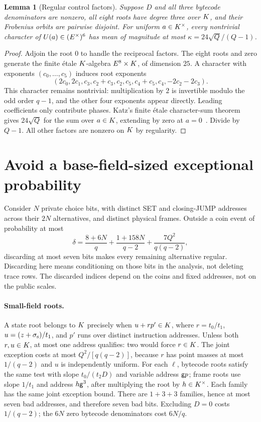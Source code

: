 \documentclass[11pt]{article}
\newtheorem{lemma}{Lemma}
\begin{document}
\begin{lemma}[Regular control factors]
Suppose $D$ and all three bytecode denominators are nonzero, all eight roots have degree three over $K$, and their Frobenius orbits are pairwise disjoint. For uniform $a\in K^\times$, every nontrivial character of $U(a)\in(E^\times)^6$ has mean of magnitude at most $\kappa=24\sqrt Q/(Q-1)$.
\end{lemma}
\begin{proof}
Adjoin the root $0$ to handle the reciprocal factors. The eight roots and zero generate the finite \'etale $K$-algebra $E^8\times K$, of dimension $25$. A character with exponents $(c_0,\ldots,c_5)$ induces root exponents
\[
 (2c_0,2c_1,c_3,c_2+c_3,c_2,c_5,c_4+c_5,c_4,-2c_2-2c_3).
\]
This character remains nontrivial: multiplication by $2$ is invertible modulo the odd order $q-1$, and the other four exponents appear directly. Leading coefficients only contribute phases. Katz's finite \'etale character-sum theorem gives $24\sqrt Q$ for the sum over $a\in K$, extending by zero at $a=0$~\cite{katz}. Divide by $Q-1$. All other factors are nonzero on $K$ by regularity.
\end{proof}

\section{Avoid a base-field-sized exceptional probability}

Consider $N$ private choice bits, with distinct SET and closing-JUMP addresses across their $2N$ alternatives, and distinct physical frames. Outside a coin event of probability at most
\[
 \delta=\frac{8+6N}{q}+\frac{1+158N}{q-2}
              +\frac{7Q^2}{q(q-2)},
\]
discarding at most seven bits makes every remaining alternative regular. Discarding here means conditioning on those bits in the analysis, not deleting trace rows. The discarded indices depend on the coins and fixed addresses, not on the public scales.

\paragraph{Small-field roots.} A state root belongs to $K$ precisely when $u+rp'\in K$, where $r=t_0/t_1$, $u=(z+\sigma_{\rm s})/t_1$, and $p'$ runs over distinct instruction addresses. Unless both $r,u\in K$, at most one address qualifies: two would force $r\in K$. The joint exception costs at most $Q^2/[q(q-2)]$, because $r$ has point masses at most $1/(q-2)$ and $u$ is independently uniform. For each $\ell$, bytecode roots satisfy the same test with slope $t_0/(t_2D)$ and variable address $\mathsf{g} p$; frame roots use slope $1/t_1$ and address $h\mathsf{g}^3$, after multiplying the root by $h\in K^\times$. Each family has the same joint exception bound. There are $1+3+3$ families, hence at most seven bad addresses, and therefore seven bad bits. Excluding $D=0$ costs $1/(q-2)$; the $6N$ zero bytecode denominators cost $6N/q$.
\end{document}
